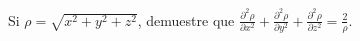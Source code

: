 \item Si $\rho = \sqrt{x^2 + y^2 + z^2}$, demuestre que $\frac{\partial^2 \rho}{\partial x^2} + \frac{\partial^2 \rho}{\partial y^2} + \frac{\partial^2 \rho}{\partial z^2} = \frac{2}{\rho}$.
